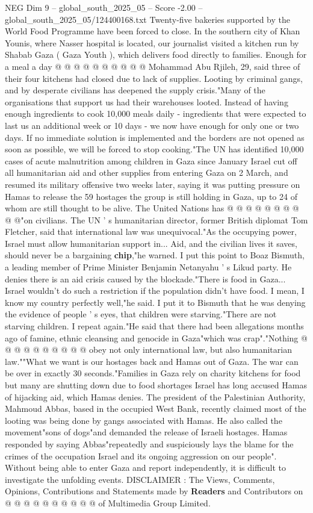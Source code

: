 \begin{textsample}{NEG Dim 9 – global\_south\_2025\_05 – Score -2.00 – global\_south\_2025\_05/124400168.txt}
Twenty-five bakeries supported by the World Food Programme have been forced to close.
In the southern city of Khan Younis, where Nasser hospital is located, our journalist visited a kitchen run by Shabab Gaza ( Gaza Youth ), which delivers food directly to families.
Enough for a meal a day @ @ @ @ @ @ @ @ @ @ Mohammad Abu Rjileh, 29, said three of their four kitchens had closed due to lack of supplies.
Looting by criminal gangs, and by desperate civilians has deepened the supply crisis."Many of the organisations that support us had their warehouses looted.
Instead of having enough ingredients to cook 10,000 meals daily - ingredients that were expected to last us an additional week or 10 days - we now have enough for only one or two days.
If no immediate solution is implemented and the borders are not opened as soon as possible, we will be forced to stop cooking."The UN has identified 10,000 cases of acute malnutrition among children in Gaza since January Israel cut off all humanitarian aid and other supplies from entering Gaza on 2 March, and resumed its military offensive two weeks later, saying it was putting pressure on Hamas to release the 59 hostages the group is still holding in Gaza, up to 24 of whom are still thought to be alive.
The United Nations has @ @ @ @ @ @ @ @ @ @"on civilians.
The UN ' s humanitarian director, former British diplomat Tom Fletcher, said that international law was unequivocal."As the occupying power, Israel must allow humanitarian support in...
Aid, and the civilian lives it saves, should never be a bargaining \textbf{chip},"he warned.
I put this point to Boaz Bismuth, a leading member of Prime Minister Benjamin Netanyahu ' s Likud party.
He denies there is an aid crisis caused by the blockade."There is food in Gaza...
Israel wouldn't do such a restriction if the population didn't have food.
I mean, I know my country perfectly well,"he said.
I put it to Bismuth that he was denying the evidence of people ' s eyes, that children were starving."There are not starving children.
I repeat again."He said that there had been allegations months ago of famine, ethnic cleansing and genocide in Gaza"which was crap"."Nothing @ @ @ @ @ @ @ @ @ @ obey not only international law, but also humanitarian law.""What we want is our hostages back and Hamas out of Gaza.
The war can be over in exactly 30 seconds."Families in Gaza rely on charity kitchens for food but many are shutting down due to food shortages Israel has long accused Hamas of hijacking aid, which Hamas denies.
The president of the Palestinian Authority, Mahmoud Abbas, based in the occupied West Bank, recently claimed most of the looting was being done by gangs associated with Hamas.
He also called the movement"sons of dogs"and demanded the release of Israeli hostages.
Hamas responded by saying Abbas"repeatedly and suspiciously lays the blame for the crimes of the occupation Israel and its ongoing aggression on our people".
Without being able to enter Gaza and report independently, it is difficult to investigate the unfolding events.
DISCLAIMER : The Views, Comments, Opinions, Contributions and Statements made by \textbf{Readers} and Contributors on @ @ @ @ @ @ @ @ @ @ of Multimedia Group Limited.


\end{textsample}
